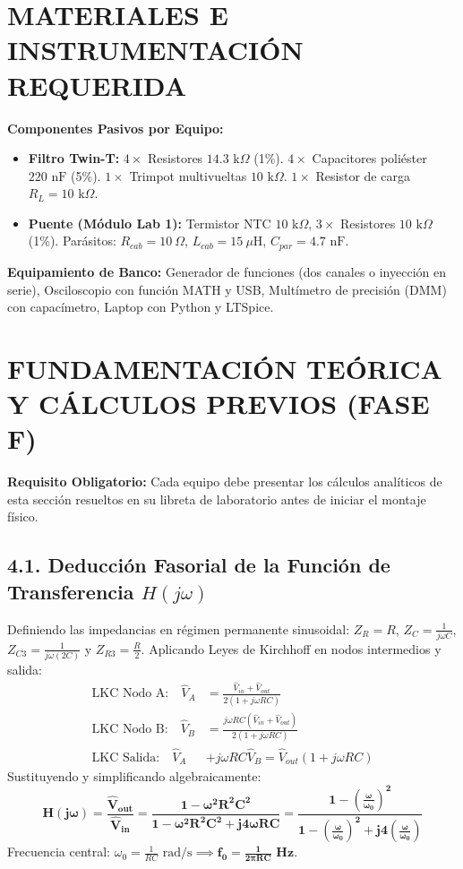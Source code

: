 \documentclass[11pt,a4paper,twoside]{article}
\begin{document}
\section{MATERIALES E INSTRUMENTACIÓN REQUERIDA}
\textbf{Componentes Pasivos por Equipo:}
\begin{itemize}[itemsep=1pt, nosep]
    \item \textbf{Filtro Twin-T:} $4 \times$ Resistores $14.3\text{ k}\Omega$ (1\%). $4 \times$ Capacitores poliéster $220\text{ nF}$ (5\%). $1 \times$ Trimpot multivueltas $10\text{ k}\Omega$. $1 \times$ Resistor de carga $R_L = 10\text{ k}\Omega$.
    \item \textbf{Puente (Módulo Lab 1):} Termistor NTC $10\text{ k}\Omega$, $3 \times$ Resistores $10\text{ k}\Omega$ (1\%). Parásitos: $R_{cab} = 10\ \Omega$, $L_{cab} = 15\ \mu\text{H}$, $C_{par} = 4.7\text{ nF}$.
\end{itemize}
\textbf{Equipamiento de Banco:} Generador de funciones (dos canales o inyección en serie), Osciloscopio con función MATH y USB, Multímetro de precisión (DMM) con capacímetro, Laptop con Python y LTSpice.

\section{FUNDAMENTACIÓN TEÓRICA Y CÁLCULOS PREVIOS (FASE F)}
\begin{info}
\textbf{Requisito Obligatorio:} Cada equipo debe presentar los cálculos analíticos de esta sección resueltos en su libreta de laboratorio antes de iniciar el montaje físico.
\end{info}

\subsection*{4.1. Deducción Fasorial de la Función de Transferencia \texorpdfstring{$H(j\omega)$}{H(jw)}}
Definiendo las impedancias en régimen permanente sinusoidal: $Z_R = R$, $Z_C = \frac{1}{j\omega C}$, $Z_{C3} = \frac{1}{j\omega (2C)}$ y $Z_{R3} = \frac{R}{2}$. Aplicando Leyes de Kirchhoff en nodos intermedios y salida:
\begin{align*}
    \text{LKC Nodo A:} \quad \hat{V}_A &= \frac{\hat{V}_{in} + \hat{V}_{out}}{2(1 + j\omega RC)} \\
    \text{LKC Nodo B:} \quad \hat{V}_B &= \frac{j\omega RC (\hat{V}_{in} + \hat{V}_{out})}{2(1 + j\omega RC)} \\
    \text{LKC Salida:} \quad \hat{V}_A &+ j\omega RC \hat{V}_B = \hat{V}_{out} (1 + j\omega RC)
\end{align*}
Sustituyendo y simplificando algebraicamente:
\begin{equation}
    \mathbf{H(j\omega) = \frac{\hat{V}_{out}}{\hat{V}_{in}} = \frac{1 - \omega^2 R^2 C^2}{1 - \omega^2 R^2 C^2 + j 4\omega RC} = \frac{1 - \left(\frac{\omega}{\omega_0}\right)^2}{1 - \left(\frac{\omega}{\omega_0}\right)^2 + j 4 \left(\frac{\omega}{\omega_0}\right)}}
\end{equation}
Frecuencia central: $\omega_0 = \frac{1}{RC}\text{ rad/s} \implies \mathbf{f_0 = \frac{1}{2\pi RC}\text{ Hz}}$.
\end{document}
